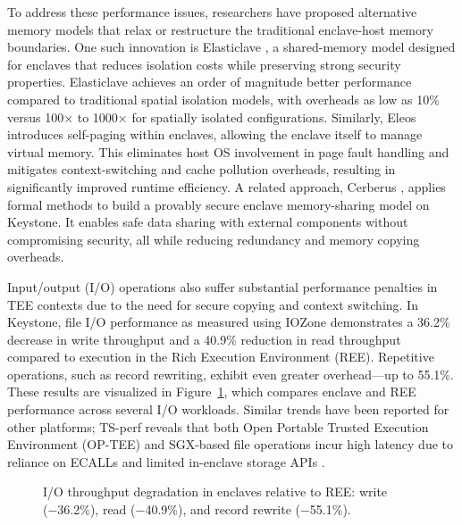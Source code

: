 To address these performance issues, researchers have proposed alternative memory models that relax or restructure the traditional enclave-host memory boundaries. One such innovation is Elasticlave \cite{yu2022elasticlave}, a shared-memory model designed for enclaves that reduces isolation costs while preserving strong security properties. Elasticlave achieves an order of magnitude better performance compared to traditional spatial isolation models, with overheads as low as 10\% versus 100× to 1000× for spatially isolated configurations. Similarly, Eleos \cite{orenbach2023eleos} introduces self-paging within enclaves, allowing the enclave itself to manage virtual memory. This eliminates host OS involvement in page fault handling and mitigates context-switching and cache pollution overheads, resulting in significantly improved runtime efficiency. A related approach, Cerberus \cite{lee2022cerberus}, applies formal methods to build a provably secure enclave memory-sharing model on Keystone. It enables safe data sharing with external components without compromising security, all while reducing redundancy and memory copying overheads.

Input/output (I/O) operations also suffer substantial performance penalties in TEE contexts due to the need for secure copying and context switching. In Keystone, file I/O performance as measured using IOZone \cite{Lee2019} demonstrates a 36.2\% decrease in write throughput and a 40.9\% reduction in read throughput compared to execution in the Rich Execution Environment (REE). Repetitive operations, such as record rewriting, exhibit even greater overhead—up to 55.1\%. These results are visualized in Figure~\ref{fig:io-throughput}, which compares enclave and REE performance across several I/O workloads. Similar trends have been reported for other platforms; TS-perf reveals that both Open Portable Trusted Execution Environment (OP-TEE) and SGX-based file operations incur high latency due to reliance on ECALLs and limited in-enclave storage APIs \cite{suzaki2021tsperf}.

\begin{figure}[htbp]
\centering
{}
\caption{I/O throughput degradation in enclaves relative to REE: write (−36.2\%), read (−40.9\%), and record rewrite (−55.1\%).}
\label{fig:io-throughput}
\end{figure}

